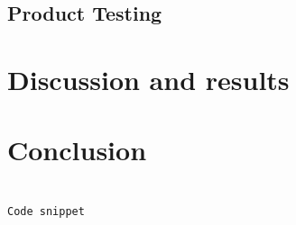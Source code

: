 \documentclass[conference]{IEEEtran}
\begin{document}
\subsection{Product Testing}

\section{Discussion and results}

\section{Conclusion}






\begin{lstlisting}[basicstyle=\tiny,language=python,caption={Code}]

Code snippet
\end{lstlisting}

\printbibliography
\end{document}
